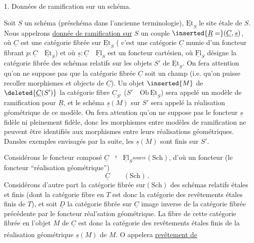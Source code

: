 
1. Données de ramification sur un schéma.

Soit $S$ un schéma (préschéma dans l'ancienne terminologie), $\underline{\mathrm{Et}}_S$ le site étale de $S$. Nous appelrons \uline{donnée de ramification sur} $S$  un couple $\inserted{\underline{R}=}(\underline{C},\underline{s})$, où $\underline{C}$ est une catégorie fibrée sur $\underline{\mathrm{Et}}_S$ ( c'est une catégorie $\underline{C}$ munie d'un foncteur fibrant $p:\underline{C}\quad\underline{\mathrm{Et}}_S$) et où $\underline{s}:\underline{C}\quad\underline{\mathrm{Fl}}_S$ est un foncteur cartésien, où $\underline{\mathrm{Fl}}_S$ désigne la catégorie fibrée des  schémas relatifs sur les objets $S'$ de $\underline{\mathrm{Et}}_S$. On fera attention qu'on ne suppose pas que la catégorie fibrée $\underline{C}$ soit un champ (i.e. qu'on puisse recoller morphismes et objects de $\underline{C}$). Un objet $\inserted{M}$ de $\deleted{\underline{C}(S')}$ la catégorie fibre $\underline{C}_{S'}$ ($S'\quad\mathrm{Ob}\,\underline{\mathrm{Et}}_S$) sera appelé un modèle de ramification pour $\underline{R}$, et le schéma $\underline{s}(M)$ sur $S'$ sera appelé la réalisation géométrique de ce modèle. On fera attention qu'on ne suppose pas le foncteur $\underline{s}$ fidèle ni pleinement fidèle, donc les morphismes entre modèles de ramification ne peuvent être identifiés aux morphismes entre leurs réalisations géométriques. Dansles exemples envisagés par la suite, les $\underline{s}(M)$ sont finis sur $S'$.

Considérons le foncteur composé $\underline{C}\overset{\underline{s}}{\qquad}\underline{\mathrm{Fl}}_S\overset{\mathrm{source}}{\qquad}(\mathrm{Sch})$, d'où un foncteur (le foncteur ``réalisation géométrique'')
\[
\underline{C}\qquad(\mathrm{Sch})\,.
\]
Considérons d'autre part la catégorie fibrée sur$(\mathrm{Sch})$ des schémas relatifs étales et finis (dont la catégorie fibre en $T$ est donc la catégorie des revêtements étales finis de $T$), et soit $\underline{D}$ la catégorie fibrée sur $\underline{C}$ image inverse de la catégorie fibrée précédente par le foncteur réal'sation géométrique. La fibre de cette catégorie fibrée en l'objet $M$ de $\underline{C}$ est donc la catégorie des revêtements étales finis de la réalisation géométrique $\underline{s}(M)$ de $M$. O\textsuperscript{} appelera \uline{revêtement de} 

